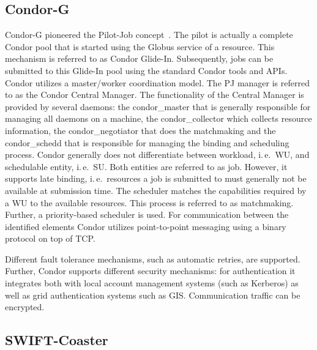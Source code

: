 \documentclass[conference,final]{IEEEtran}
\newcommand{\upp}{\vspace*{-0.5em}}
\begin{document}
\upp
\subsection{Condor-G\upp\upp}

Condor-G pioneered the Pilot-Job concept~\cite{condor-g}. The pilot is
actually a complete Condor pool that is started using the Globus service of a
resource. This mechanism is referred to as Condor Glide-In. Subsequently, jobs can be submitted to this Glide-In pool using the
standard Condor tools and APIs. Condor utilizes a master/worker coordination
model. The PJ manager is referred to as the Condor Central Manager. The
functionality of the Central Manager is provided by several daemons: the
condor\_master that is generally responsible for managing all daemons on a
machine, the condor\_collector which collects resource information, the
condor\_negotiator that does the matchmaking and the condor\_schedd that is
responsible for managing the binding and scheduling process. Condor generally
does not differentiate between workload, i.\,e.\ WU, and schedulable entity,
i.\,e.\ SU. Both entities are referred to as job. However, it supports late
binding, i.\,e.\ resources a job is submitted to must generally not be available
at submission time. The scheduler matches the capabilities required by a WU to
the available resources. This process is referred to as matchmaking. Further, a
priority-based scheduler is used. For communication between the identified
elements Condor utilizes point-to-point messaging using a binary protocol on top
of TCP.

Different fault tolerance mechanisms, such as automatic retries, are supported.
Further, Condor supports different security mechanisms: for authentication it
integrates both with local account management systems (such as Kerberos) as well
as grid authentication systems such as GIS. Communication traffic can be
encrypted.


\upp
\subsection{SWIFT-Coaster\upp\upp}
\end{document}
